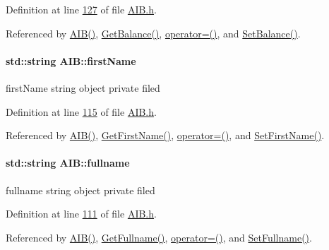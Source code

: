 Definition at line \hyperlink{_a_i_b_8h_source_l00127}{127} of file \hyperlink{_a_i_b_8h_source}{A\+I\+B.\+h}.



Referenced by \hyperlink{_a_i_b_8h_source_l00028}{A\+I\+B()}, \hyperlink{_a_i_b_8cpp_source_l00084}{Get\+Balance()}, \hyperlink{_a_i_b_8h_source_l00078}{operator=()}, and \hyperlink{_a_i_b_8cpp_source_l00078}{Set\+Balance()}.

\paragraph[{\texorpdfstring{first\+Name}{firstName}}]{\setlength{\rightskip}{0pt plus 5cm}std\+::string A\+I\+B\+::first\+Name\hspace{0.3cm}{\ttfamily [private]}}\hypertarget{class_a_i_b_a869f72057cb63ebf0cfd257069e15c7c_a869f72057cb63ebf0cfd257069e15c7c}{}\label{class_a_i_b_a869f72057cb63ebf0cfd257069e15c7c_a869f72057cb63ebf0cfd257069e15c7c}
first\+Name string object private filed 

Definition at line \hyperlink{_a_i_b_8h_source_l00115}{115} of file \hyperlink{_a_i_b_8h_source}{A\+I\+B.\+h}.



Referenced by \hyperlink{_a_i_b_8h_source_l00028}{A\+I\+B()}, \hyperlink{_a_i_b_8cpp_source_l00120}{Get\+First\+Name()}, \hyperlink{_a_i_b_8h_source_l00078}{operator=()}, and \hyperlink{_a_i_b_8cpp_source_l00114}{Set\+First\+Name()}.

\paragraph[{\texorpdfstring{fullname}{fullname}}]{\setlength{\rightskip}{0pt plus 5cm}std\+::string A\+I\+B\+::fullname\hspace{0.3cm}{\ttfamily [private]}}\hypertarget{class_a_i_b_a818b0cc283af23127c067fb3fc751058_a818b0cc283af23127c067fb3fc751058}{}\label{class_a_i_b_a818b0cc283af23127c067fb3fc751058_a818b0cc283af23127c067fb3fc751058}
fullname string object private filed 

Definition at line \hyperlink{_a_i_b_8h_source_l00111}{111} of file \hyperlink{_a_i_b_8h_source}{A\+I\+B.\+h}.



Referenced by \hyperlink{_a_i_b_8h_source_l00028}{A\+I\+B()}, \hyperlink{_a_i_b_8cpp_source_l00132}{Get\+Fullname()}, \hyperlink{_a_i_b_8h_source_l00078}{operator=()}, and \hyperlink{_a_i_b_8cpp_source_l00126}{Set\+Fullname()}.

